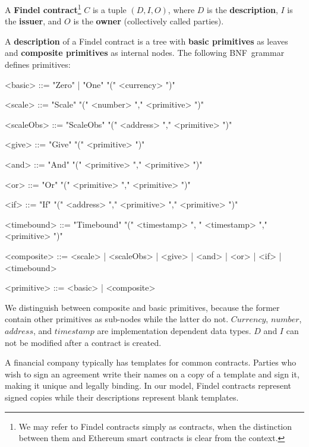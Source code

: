 \begin{definition} \label{def:Ch10FindelFindelContract}
	A \textbf{Findel contract}\footnote{We may refer to Findel contracts simply as contracts, when the distinction between them and Ethereum smart contracts is clear from the context.} $C$ is a tuple $(D,I,O)$, where $D$ is the \textbf{description}, $I$ is the \textbf{issuer}, and $O$ is the \textbf{owner} (collectively called parties). 
\end{definition}

\begin{definition} \label{def:Ch10FindelDescription}
	A \textbf{description} of a Findel contract is a tree with \textbf{basic primitives} as leaves and \textbf{composite primitives} as internal nodes. The following BNF~grammar defines primitives:
	\begin{grammar}
		
		<basic> ::= "Zero" | "One" "(" <currency> ")"
		
		<scale> ::= "Scale" "(" <number> "," <primitive> ")"
		
		<scaleObs> ::= "ScaleObs" "(" <address> "," <primitive> ")"
		
		<give> ::= "Give" "(" <primitive> ")"
		
		<and> ::= "And" "(" <primitive> "," <primitive> ")"
		
		<or> ::= "Or" "(" <primitive> "," <primitive> ")"
		
		<if> ::= "If" "(" <address> "," <primitive> "," <primitive> ")"
		
		<timebound> ::= "Timebound" "(" <timestamp> ", " <timestamp> "," <primitive> ")"
		
		<composite> ::= <scale> | <scaleObs> | <give> | <and> | <or> | <if> | <timebound>
		
		<primitive> ::= <basic> | <composite>
		
	\end{grammar}
\end{definition}

We distinguish between composite and basic primitives, because the former contain other primitives as sub-nodes while the latter do not.
\(Currency\), \(number\), \(address\), and \(timestamp\) are implementation dependent data types.
$D$ and $I$ can not be modified after a contract is created.

A financial company typically has templates for common contracts.
Parties who wish to sign an agreement write their names on a copy of a template and sign it, making it unique and legally binding.
In our model, Findel contracts represent signed copies while their descriptions represent blank templates.

